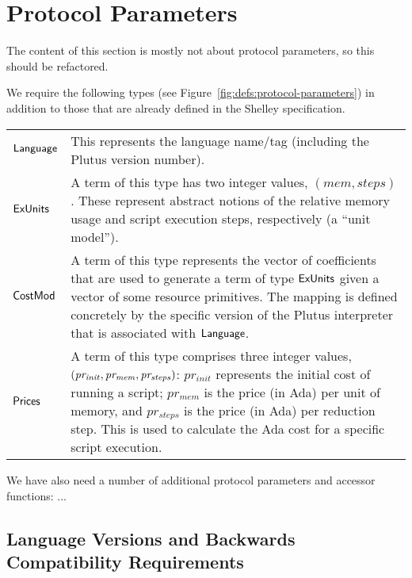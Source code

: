 \section{Protocol Parameters}
\label{sec:protocol-parameters}

\begin{note}
  The content of this section is mostly not about protocol parameters, so this should be refactored.
\end{note}

We require the following types (see Figure~\ref{fig:defs:protocol-parameters})
in addition to those that are already defined in the Shelley specification.

\vspace{12pt}
\begin{tabular}{lp{5in}}
  $\mathsf{Language}$ &
  This represents the language name/tag (including the Plutus
  version number).
  \\
  $\mathsf{ExUnits}$ &
  A term of this type has two integer values,
  $(mem, steps)$.
  These represent abstract notions of the relative memory usage and script execution steps,
  respectively (a ``unit model'').
  \\
  $\mathsf{CostMod}$ &
  A term of this type represents the vector of coefficients that are used to generate
  a term of type $\mathsf{ExUnits}$ given a vector of some resource primitives.  The mapping is defined
  concretely by the specific version of the Plutus interpreter that is associated with $\mathsf{Language}$.
  \\
  $\mathsf{Prices}$ &
  A term of this type comprises three integer values,
  $\mathit{(pr_{init}, pr_{mem}, pr_{steps})}$: $pr_{init}$ represents the initial
  cost of running a script; $pr_{mem}$ is the price (in Ada) per unit of memory, and $pr_{steps}$ is the price (in Ada) per
  reduction step. This is used to calculate the Ada cost for a specific script execution.
\end{tabular}
\vspace{12pt}

We have also need a number of additional protocol parameters and accessor functions: ...

\subsection{Language Versions and Backwards Compatibility Requirements}
\label{sec:versions}

